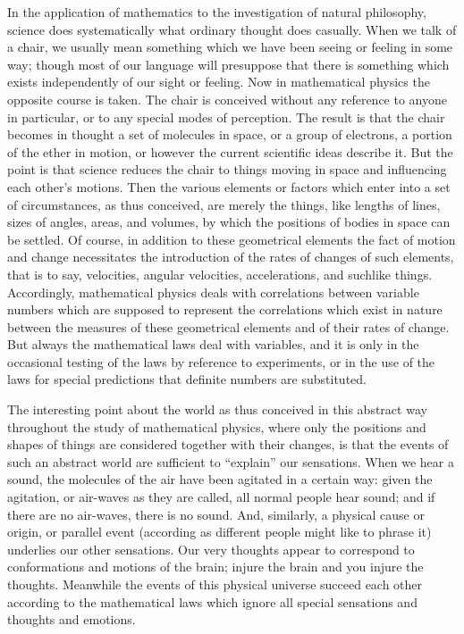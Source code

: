 \documentclass[12pt,leqno]{book}[2005/09/16]
\newcommand{\PageSep}[1]{\ignorespaces}
\begin{document}
In the application of mathematics to the
investigation of natural philosophy, science
does systematically what ordinary thought
does casually. When we talk of a chair, we
usually mean something which we have been
seeing or feeling in some way; though most
of our language will presuppose that there
is something which exists independently of
our sight or feeling. Now in mathematical
physics the opposite course is taken. The
chair is conceived without any reference to
\PageSep{49}
%
anyone in particular, or to any special modes
of perception. The result is that the chair
becomes in thought a set of molecules in space,
or a group of electrons, a portion of the ether
in motion, or however the current scientific
ideas describe it. But the point is that
science reduces the chair to things moving in
space and influencing each other's motions.
Then the various elements or factors which
enter into a set of circumstances, as thus
conceived, are merely the things, like lengths
of lines, sizes of angles, areas, and volumes, by
which the positions of bodies in space can be
settled. Of course, in addition to these geometrical
elements the fact of motion and
change necessitates the introduction of the
rates of changes of such elements, that is to
say, velocities, angular velocities, accelerations,
and suchlike things. Accordingly, mathematical
physics deals with correlations between
variable numbers which are supposed
to represent the correlations which exist in
nature between the measures of these geometrical
elements and of their rates of change.
But always the mathematical laws deal with
variables, and it is only in the occasional
testing of the laws by reference to experiments,
or in the use of the laws for special
predictions that definite numbers are substituted.

The interesting point about the world as
\PageSep{50}
thus conceived in this abstract way throughout
the study of mathematical physics, where
only the positions and shapes of things are
considered together with their changes, is that
the events of such an abstract world are sufficient
to ``explain'' our sensations. When we
hear a sound, the molecules of the air have
been agitated in a certain way: given the
agitation, or air-waves as they are called, all
normal people hear sound; and if there are
no air-waves, there is no sound. And, similarly,
a physical cause or origin, or parallel
event (according as different people might like
to phrase it) underlies our other sensations.
Our very thoughts appear to correspond to
conformations and motions of the brain; injure
the brain and you injure the thoughts.
Meanwhile the events of this physical universe
succeed each other according to the mathematical
laws which ignore all special sensations
and thoughts and emotions.
\end{document}
